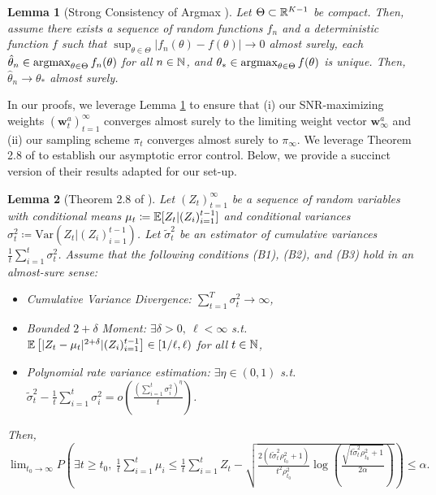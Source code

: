 \documentclass{article}
\newtheorem{lemma}{Lemma}
\begin{document}
\begin{appendices}
\begin{lemma}[Strong Consistency of Argmax \citep{vandervaart1996weak}]\label{lem:conv_argmax}
    Let $\Theta \subset \mathbb{R}^{K-1}$ be compact. Then, assume there exists a sequence of random functions $f_n$ and a deterministic function $f$ such that $\sup_{\theta \in \Theta} |f_n(\theta) - f(\theta) | \rightarrow 0$ almost surely, each $\hat\theta_n \in \argmax_{\theta \in \Theta} f_n(\theta)$ for all $n \in \mathbb{N}$, and $\theta_* \in \argmax_{\theta \in \Theta} f(\theta)$ is unique. Then, $\hat\theta_n \rightarrow \theta_*$ almost surely.  
\end{lemma}
In our proofs, we leverage Lemma \ref{lem:conv_argmax} to ensure that (i) our SNR-maximizing weights $(\bm{w}_t^a)_{t=1}^\infty$ converges almost surely to the limiting weight vector $\bm{w}_\infty^a$ and (ii) our sampling scheme $\pi_t$ converges almost surely to $\pi_\infty$. We leverage Theorem 2.8 of \cite{waudbysmith2024timeuniformcentrallimittheory} to establish our asymptotic error control. Below, we provide a succinct version of their results adapted for our set-up. 

\begin{lemma}[Theorem 2.8 of \cite{waudbysmith2024timeuniformcentrallimittheory}]\label{thm:waudby_smith}
        Let $(Z_t)_{t=1}^\infty$ be a sequence of random variables with conditional means $\mu_t \coloneqq \mathbb{E}[Z_t|(Z_i)_{i=1}^{t-1}]$ and conditional variances $\sigma_t^2 \coloneqq \text{Var}(Z_t|(Z_i)_{i=1}^{t-1})$. Let $\tilde\sigma_t^2$ be an estimator of cumulative variances $\frac{1}{t}\sum_{i=1}^t \sigma_t^2$. Assume that the following conditions (B1), (B2), and (B3) hold in an almost-sure sense:
        \begin{itemize}
            \item[(B1)] Cumulative Variance Divergence: $\sum_{t=1}^T \sigma_t^2 \rightarrow \infty$,
            \item[(B2)] Bounded $2+\delta$ Moment: $\exists \delta >0, \ \ell < \infty$ s.t. $\mathbb{E}\left[|Z_t - \mu_t|^{2+\delta}|(Z_i)_{i=1}^{t-1}\right] \in [1/\ell, \ell)$ for all $t \in \mathbb{N}$,
            \item[(B3)] Polynomial rate variance estimation: $\exists \eta \in (0,1)$ s.t. $\tilde\sigma_t^2 - \frac{1}{t}\sum_{i=1}^t \sigma_i^2 = o\left(\frac{(\sum_{i=1}^t \sigma_i^2)^\eta}{t}\right)$.
        \end{itemize}
        Then, 
        $\lim_{t_0 \rightarrow \infty}P\left(\exists t \geq t_0, \ \frac{1}{t}\sum_{i=1}^t\mu_i \leq \frac{1}{t}\sum_{i=1}^t Z_t - \sqrt{\frac{2(t\tilde\sigma_t^2\rho_{t_0}^2 + 1)}{t^2 \rho_{t_0}^2}\log\left(\frac{\sqrt{t\tilde\sigma_t^2 \rho_{t_0}^2+1}} {2\alpha} \right)}\right) \leq \alpha.$ 
\end{lemma}


\end{appendices}
\end{document}

